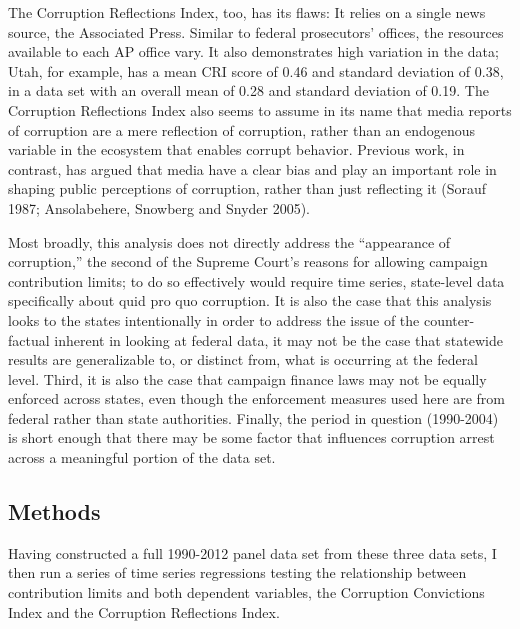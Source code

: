 \documentclass{jopsubmission}
\begin{document}
The Corruption Reflections Index, too, has its flaws: It relies on a
single news source, the Associated Press. Similar to federal
prosecutors' offices, the resources available to each AP office vary. It
also demonstrates high variation in the data; Utah, for example, has a
mean CRI score of 0.46 and standard deviation of 0.38, in a data set
with an overall mean of 0.28 and standard deviation of 0.19. The
Corruption Reflections Index also seems to assume in its name that media
reports of corruption are a mere reflection of corruption, rather than
an endogenous variable in the ecosystem that enables corrupt behavior.
Previous work, in contrast, has argued that media have a clear bias and
play an important role in shaping public perceptions of corruption,
rather than just reflecting it (Sorauf 1987; Ansolabehere, Snowberg and
Snyder 2005).

Most broadly, this analysis does not directly address the ``appearance
of corruption,'' the second of the Supreme Court's reasons for allowing
campaign contribution limits; to do so effectively would require time
series, state-level data specifically about quid pro quo corruption. It
is also the case that this analysis looks to the states intentionally in
order to address the issue of the counter-factual inherent in looking at
federal data, it may not be the case that statewide results are
generalizable to, or distinct from, what is occurring at the federal
level. Third, it is also the case that campaign finance laws may not be
equally enforced across states, even though the enforcement measures
used here are from federal rather than state authorities. Finally, the
period in question (1990-2004) is short enough that there may be some
factor that influences corruption arrest across a meaningful portion of
the data set.

\subsection{Methods}\label{methods}

Having constructed a full 1990-2012 panel data set from these three data
sets, I then run a series of time series regressions testing the
relationship between contribution limits and both dependent variables,
the Corruption Convictions Index and the Corruption Reflections Index.
\end{document}

